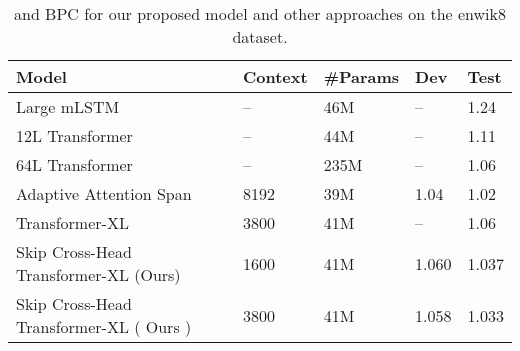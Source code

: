 \documentclass[11pt]{article}
\begin{document}
\begin{table*}
\centering
\begin{tabular}{lllll}
\hline
\textbf{Model} & \textbf{Context} & \textbf{\#Params} & \textbf{Dev} & \textbf{Test}\\
\hline
 Large mLSTM ~\citep{DBLP:conf/iclr/Krause0RL17} & -- & 46M & -- & 1.24 \\
  12L Transformer ~\citep{Al-Rfou_Choe_Constant_Guo_Jones_2019} & -- & 44M  & --  &  1.11  \\
  64L Transformer ~\citep{Al-Rfou_Choe_Constant_Guo_Jones_2019} & -- & 235M  & --  &  1.06  \\
  Adaptive Attention Span~\citep{DBLP:conf/acl/SukhbaatarGBJ19} & 8192 & 39M  & 1.04  & 1.02 \\

\hline
  Transformer-XL ~\citep{DBLP:conf/acl/DaiYYCLS19} & 3800 & 41M  & --  & 1.06   \\
Skip Cross-Head Transformer-XL (Ours) & 1600 & 41M &  1.060 & 1.037  \\
Skip Cross-Head Transformer-XL ( Ours ) & 3800 & 41M & 1.058 &  1.033  \\

\hline
\end{tabular}
\caption{
 and  BPC for our proposed model and other approaches on the enwik8 dataset.
}
\label{table:enwik8}
\end{table*}
\end{document}
